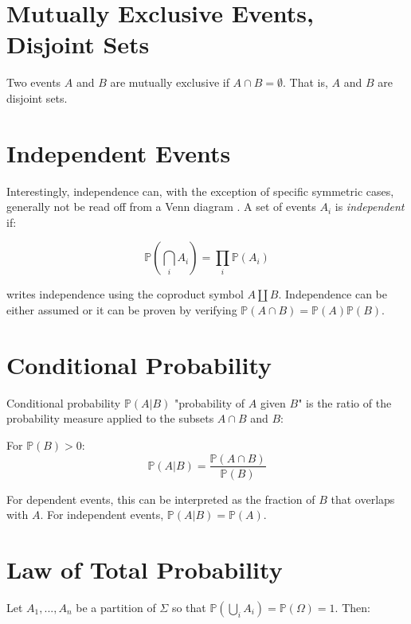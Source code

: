 


\section{Mutually Exclusive Events, Disjoint Sets}
Two events $A$ and $B$ are mutually exclusive if $A\cap B= \emptyset$. That is, $A$ and $B$ are disjoint sets.

\section{Independent Events}
Interestingly, independence can, with the exception of specific symmetric cases, generally not be read off from a Venn diagram \cite{wasserman2013all}. A set of events $A_i$ is \textit{independent} if:

\begin{equation}
\mathbb{P}\left(\bigcap_i A_i \right) = \prod_i \mathbb{P}(A_i)
\end{equation}

 writes independence using the coproduct symbol $A\coprod B$. Independence can be either assumed or it can be proven by verifying $\mathbb{P}(A\cap B) = \mathbb{P}(A)\mathbb{P}(B)$.


\section{Conditional Probability}
Conditional probability $\mathbb{P}(A|B)$ "probability of $A$ given $B$" is the ratio of the probability measure applied to the subsets $A\cap B$ and $B$:

For $\mathbb{P}(B) > 0$:
\begin{equation}
\mathbb{P}(A|B) = \frac{\mathbb{P}(A\cap B)}{\mathbb{P}(B)}
\end{equation}

For dependent events, this can be interpreted as the fraction of $B$ that overlaps with $A$. For independent events, $\mathbb{P}(A|B) = \mathbb{P}(A)$. 



\section{Law of Total Probability}

Let $A_1,...,A_n$ be a partition of $\Sigma$ so that $\mathbb{P}(\bigcup_i A_i) = \mathbb{P}(\Omega) = 1$. Then:

